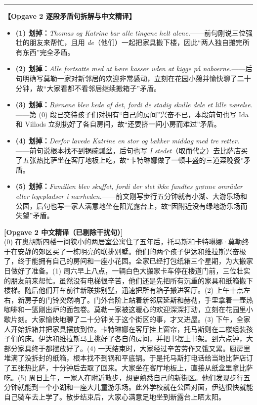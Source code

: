 \begin{answerbox}
\vspace{0.45em}
\hrule
\vspace{0.45em}
\textbf{\color{NCDNavy}【Opgave 2 逐段矛盾句拆解与中文精译】}
\begin{itemize}
  \item \textbf{(1) 划掉：}\textit{Thomas og Katrine bar alle tingene helt alene.}——前句刚说三位强壮的朋友来帮忙，且用 \textit{de}（他们）一起把家具搬下楼，因此“两人独自搬完所有东西”完全矛盾。
  \item \textbf{(2) 划掉：}\textit{Alle fortsatte med at bære kasser uden at kigge på naboerne.}——后句明确写莫勒一家对新邻居的欢迎非常感动，立刻在花园小憩并愉快聊了二十分钟，故“大家看都不看邻居继续搬箱子”矛盾。
  \item \textbf{(3) 划掉：}\textit{Børnene blev kede af det, fordi de stadig skulle dele et lille værelse.}——第 (0) 段已交待孩子们对拥有“自己的房间”兴奋不已，本段前句也写 Ida 和 Villads 立刻挑好了各自房间，故“还要挤一间小房而难过”矛盾。
  \item \textbf{(4) 划掉：}\textit{Derfor lavede Katrine en stor og lækker middag med tre retter.}——前句说根本找不到锅碗瓢盆，后句也写 \textit{I stedet}（取而代之）去比萨店买了五张热比萨坐在客厅地板上吃，故“卡特琳娜做了一顿丰盛的三道菜晚餐”矛盾。
  \item \textbf{(5) 划掉：}\textit{Familien blev skuffet, fordi der slet ikke fandtes grønne områder eller legepladser i nærheden.}——前文刚写步行五分钟就有小湖、大游乐场和公园，后句也写一家人满意地坐在阳光露台上，故“因附近没有绿地游乐场而失望”矛盾。
\end{itemize}

\textbf{\color{NCDTeal}[Opgave 2 中文精译（已剔除干扰句）]}\\
(0) 在奥胡斯四楼一间狭小的两居室公寓住了五年后，托马斯和卡特琳娜·莫勒终于在安静的郊区买了一栋明亮的联排别墅。他们的两个孩子伊达和维拉斯兴奋极了，终于能拥有自己的房间和一座小花园。全家已经打包纸箱三个星期，为大搬家日做好了准备。(1) 周六早上八点，一辆白色大搬家卡车停在楼道门前，三位壮实的朋友前来帮忙。虽然没有电梯很辛苦，他们还是先把所有沉重的家具和纸箱搬下楼梯。随后他们开车前往新联排别墅，迅速把所有箱子搬进客厅。(2) 上午十点左右，新房子的门铃突然响了。门外台阶上站着新邻居延斯和赫勒，手里拿着一壶热咖啡和一篮刚出炉的面包卷。莫勒一家被这暖心的欢迎深深打动，立刻在花园里小歇片刻。大家愉快地聊了二十分钟关于这个街区的事，才又进屋。(3) 下午，全家人开始拆箱并把家具摆放到位。卡特琳娜在客厅挂上窗帘，托马斯则在二楼组装孩子们的床。伊达和维拉斯马上挑好了各自的房间，并把书摆上书架。到六点钟，大部分家具终于都摆放好了。(4) 一天结束时，大家经过辛苦劳作又饿又累。厨房里堆满了没拆封的纸箱，根本找不到锅和平底锅。于是托马斯打电话给当地比萨店订了五张热比萨，十分钟后去取了回来。大家坐在客厅地板上，直接从纸盒里拿比萨吃。(5) 周日上午，一家人在附近散步，想更熟悉自己的新街区。他们发现步行五分钟就能到一个小湖和一座大儿童游乐场。此外学校就在公园对面，伊达很快就能自己骑车去上学了。散步结束后，大家心满意足地坐到新露台上晒太阳。


\end{answerbox}

